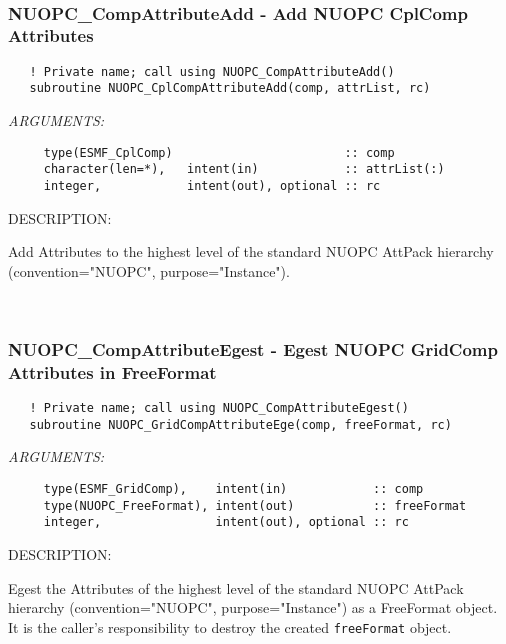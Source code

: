\mbox{}\hrulefill\ 
 
\subsubsection [NUOPC\_CompAttributeAdd] {NUOPC\_CompAttributeAdd - Add NUOPC CplComp Attributes}


\begin{verbatim}   ! Private name; call using NUOPC_CompAttributeAdd() 
   subroutine NUOPC_CplCompAttributeAdd(comp, attrList, rc)\end{verbatim}{\em ARGUMENTS:}
\begin{verbatim}     type(ESMF_CplComp)                        :: comp
     character(len=*),   intent(in)            :: attrList(:)
     integer,            intent(out), optional :: rc\end{verbatim}
{\sf DESCRIPTION:\\ }


     Add Attributes to the highest level of the standard NUOPC AttPack
     hierarchy (convention="NUOPC", purpose="Instance"). 
 
\mbox{}\hrulefill\ 
 
\subsubsection [NUOPC\_CompAttributeEgest] {NUOPC\_CompAttributeEgest - Egest NUOPC GridComp Attributes in FreeFormat}


\begin{verbatim}   ! Private name; call using NUOPC_CompAttributeEgest() 
   subroutine NUOPC_GridCompAttributeEge(comp, freeFormat, rc)\end{verbatim}{\em ARGUMENTS:}
\begin{verbatim}     type(ESMF_GridComp),    intent(in)            :: comp
     type(NUOPC_FreeFormat), intent(out)           :: freeFormat
     integer,                intent(out), optional :: rc\end{verbatim}
{\sf DESCRIPTION:\\ }


     Egest the Attributes of the highest level of the standard NUOPC AttPack
     hierarchy (convention="NUOPC", purpose="Instance") as a FreeFormat object.
     It is the caller's responsibility to destroy the created {\tt freeFormat}
     object. 
 
